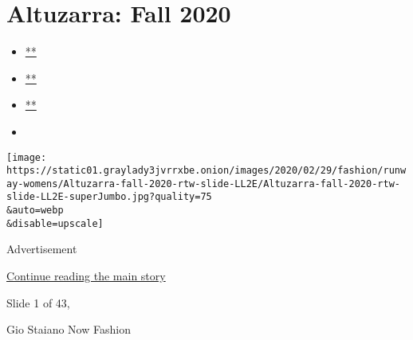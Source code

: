\hypertarget{altuzarra-fall-2020}{%
\section{Altuzarra: Fall 2020}\label{altuzarra-fall-2020}}

\begin{itemize}
\item
  \href{https://www.facebookcorewwwi.onion/sharer.php?app_id=9869919170\&u=https\%3A\%2F\%2Fwww.nytimes3xbfgragh.onion\%2Fslideshow\%2F2020\%2F02\%2F29\%2Ffashion\%2Frunway-womens\%2Faltuzarra-fall-2020.html\%3Fsmid\%3Dfb-share\&name=Altuzarra\%3A\%20Fall\%202020\&redirect_uri=https\%3A\%2F\%2Fwww.facebookcorewwwi.onion\%2F}{**}
\item
  \href{https://twitter.com/intent/tweet?url=https\%3A\%2F\%2Fwww.nytimes3xbfgragh.onion\%2Fslideshow\%2F2020\%2F02\%2F29\%2Ffashion\%2Frunway-womens\%2Faltuzarra-fall-2020.html\%3Fsmid\%3Dtw-share\&text=Altuzarra\%3A\%20Fall\%202020}{**}
\item
  \href{mailto:?subject=nytimes3xbfgragh.onion\%3A\%20Altuzarra\%3A\%20Fall\%202020\&body=From\%20The\%20New\%20York\%20Times\%3A\%0A\%0AAltuzarra\%3A\%20Fall\%202020\%0A\%0ASee\%20the\%20looks\%20from\%20the\%20Altuzarra\%3A\%20Fall\%202020\%20Collection.\%0A\%0Ahttps\%3A\%2F\%2Fwww.nytimes3xbfgragh.onion\%2Fslideshow\%2F2020\%2F02\%2F29\%2Ffashion\%2Frunway-womens\%2Faltuzarra-fall-2020.html\%3Fsmid\%3Dem-share}{**}
\item
\end{itemize}

\texttt{[image: https://static01.graylady3jvrrxbe.onion/images/2020/02/29/fashion/runway-womens/Altuzarra-fall-2020-rtw-slide-LL2E/Altuzarra-fall-2020-rtw-slide-LL2E-superJumbo.jpg?quality=75\\\&auto=webp\\\&disable=upscale]}

Advertisement

\protect\hyperlink{after-right-0}{Continue reading the main story}

Slide 1 of 43,

Gio Staiano Now Fashion

